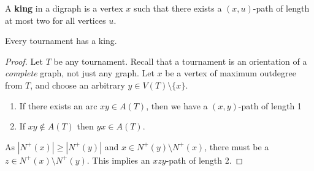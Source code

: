 A \textbf{king} in a digraph is a vertex $x$ such that there exists a $(x,u)$-path of length at most two for all vertices $u$.

\begin{proposition}[Landau, 1953]
	Every tournament has a king.
\end{proposition}

\begin{proof}
	Let $T$ be any tournament. Recall that a tournament is an orientation of a \textit{complete} graph, not just any graph. Let $x$ be a vertex of maximum outdegree from $T$, and choose an arbitrary $y \in V(T) \setminus \{x\}$.

	\begin{enumerate}
		\item If there exists an arc $xy \in A(T)$, then we have a $(x,y)$-path of length 1
		\item If $xy \notin A(T)$ then $yx \in A(T)$.
	\end{enumerate}
	As $|N^{+}(x)| \ge |N^{+}(y)|$ and $x \in N^{+}(y) \setminus N^{+}(x)$, there must be a $z \in N^{+}(x) \setminus N^{+}(y)$. This implies an $xzy$-path of length 2.
\end{proof}


